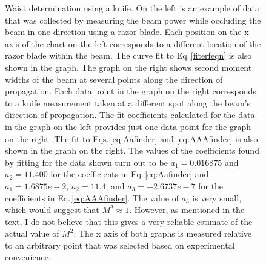 \begin{figure}
{%
Waist determination using a knife. On the left is an example of data that was collected by measuring the beam power while occluding the beam in one direction using a razor blade. Each position on the x axis of the chart on the left corresponds to a different location of the razor blade within the beam. The curve fit to Eq.\,\ref{fiterfeqn} is also shown in the graph.
The graph on the right shows second moment widths of the beam at several points along the direction of propagation. Each data point in the graph on the right corresponds to a knife measurement taken at a different spot along the beam's direction of propagation. The fit coefficients calculated for the data in the graph on the left provides just one data point for the graph on the right. The fit to Eqs.\,\ref{eq:Aafinder} and \ref{eq:AAAfinder} is also shown in the graph on the right. 
The values of the coefficients found by fitting for the data shown turn out to be $a_1=0.016875$ and $a_2=11.400$ for the coefficients in Eq.\,\ref{eq:Aafinder} and $a_1=1.6875e-2$, $a_2 = 11.4$, and $a_3=-2.6737e-7$ for the coefficients in Eq.\,\ref{eq:AAAfinder}. The value of $a_3$ is very small, which would suggest that $M^2\approx1$. However, as mentioned in the text, I do not believe that this gives a very reliable estimate of the actual value of $M^2$. The x axis of both graphs is measured relative to an arbitrary point that was selected based on experimental convenience.
}
\end{figure}

